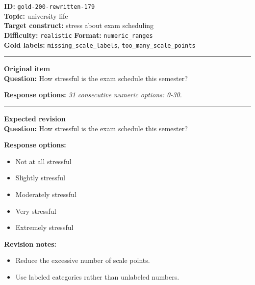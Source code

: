 \documentclass[10pt,a4paper]{article}
\newcommand{\sectionline}{\vspace{0.15em}\hrule\vspace{0.35em}}
\begin{document}
\begin{tcolorbox}[colframe=FlawRed,colback=white,colbacktitle=FlawRed!9,coltitle=black,title={Item 179\hfill Flawed item}]
\textbf{ID:} \texttt{gold-200-rewritten-179}\\
\textbf{Topic:} university life\\
\textbf{Target construct:} stress about exam scheduling\\
\textbf{Difficulty:} \texttt{realistic} \quad \textbf{Format:} \texttt{numeric\_ranges}\\
\textbf{Gold labels:} \texttt{missing\_scale\_labels}, \texttt{too\_many\_scale\_points}\\
\sectionline
\textbf{Original item}\\
\textbf{Question:} How stressful is the exam schedule this semester?
\par\textbf{Response options:}
\textit{31 consecutive numeric options: 0-30.}
\sectionline
\textbf{Expected revision}\\
\textbf{Question:} How stressful is the exam schedule this semester?
\par\textbf{Response options:}
\begin{itemize}
\item Not at all stressful
\item Slightly stressful
\item Moderately stressful
\item Very stressful
\item Extremely stressful
\end{itemize}
\par\textbf{Revision notes:}
\begin{itemize}
\item Reduce the excessive number of scale points.
\item Use labeled categories rather than unlabeled numbers.
\end{itemize}
\end{tcolorbox}
\end{document}
